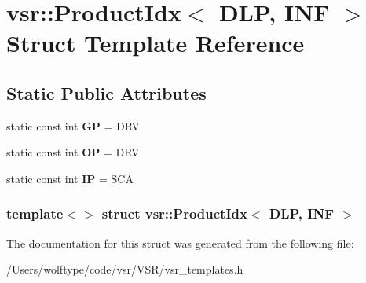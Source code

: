 \hypertarget{structvsr_1_1_product_idx_3_01_d_l_p_00_01_i_n_f_01_4}{\section{vsr\-:\-:Product\-Idx$<$ D\-L\-P, I\-N\-F $>$ Struct Template Reference}
\label{structvsr_1_1_product_idx_3_01_d_l_p_00_01_i_n_f_01_4}
}
\subsection*{Static Public Attributes}
\begin{DoxyCompactItemize}
\item 
\hypertarget{structvsr_1_1_product_idx_3_01_d_l_p_00_01_i_n_f_01_4_a9d8733d914eb07f2045184c390ddc7bd}{static const int {\bfseries G\-P} = D\-R\-V}\label{structvsr_1_1_product_idx_3_01_d_l_p_00_01_i_n_f_01_4_a9d8733d914eb07f2045184c390ddc7bd}

\item 
\hypertarget{structvsr_1_1_product_idx_3_01_d_l_p_00_01_i_n_f_01_4_a66961db7f5b6211fb280b4c740431013}{static const int {\bfseries O\-P} = D\-R\-V}\label{structvsr_1_1_product_idx_3_01_d_l_p_00_01_i_n_f_01_4_a66961db7f5b6211fb280b4c740431013}

\item 
\hypertarget{structvsr_1_1_product_idx_3_01_d_l_p_00_01_i_n_f_01_4_a5dcbdd5fa78e2eb52e4114f2cc8a1b6c}{static const int {\bfseries I\-P} = S\-C\-A}\label{structvsr_1_1_product_idx_3_01_d_l_p_00_01_i_n_f_01_4_a5dcbdd5fa78e2eb52e4114f2cc8a1b6c}

\end{DoxyCompactItemize}
\subsubsection*{template$<$$>$ struct vsr\-::\-Product\-Idx$<$ D\-L\-P, I\-N\-F $>$}



The documentation for this struct was generated from the following file\-:\begin{DoxyCompactItemize}
\item 
/\-Users/wolftype/code/vsr/\-V\-S\-R/vsr\-\_\-templates.\-h\end{DoxyCompactItemize}
